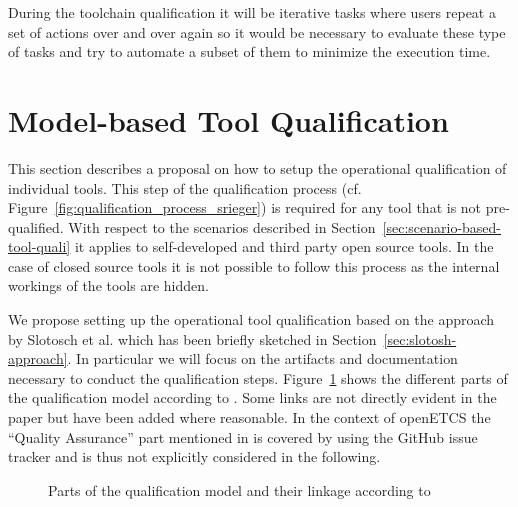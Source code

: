During the toolchain qualification it will be iterative tasks where users repeat a set of actions over and over again so it would be necessary to evaluate these type of tasks and try to automate a subset of them to minimize the execution time.


\section{Model-based Tool Qualification}
\label{sec:model-based-tool-quali}

This section describes a proposal on how to setup the operational qualification of individual tools. This step of the qualification process (cf. Figure~\ref{fig:qualification_process_srieger}) is required for any tool that is not pre-qualified. With respect to the scenarios described in Section~\ref{sec:scenario-based-tool-quali} it applies to self-developed and third party open source tools. In the case of closed source tools it is not possible to follow this process as the internal workings of the tools are hidden.

We propose setting up the operational tool qualification based on the approach by Slotosch et al. which has been briefly sketched in Section~\ref{sec:slotosh-approach}. In particular we will focus on the artifacts and documentation necessary to conduct the qualification steps. Figure~\ref{fig:qualification-models-linkage} shows the different parts of the qualification model according to \cite{slotosch_model-based_2012}. Some links are not directly evident in the paper but have been added where reasonable. In the context of openETCS the ``Quality Assurance'' part mentioned in \cite{slotosch_model-based_2012} is covered by using the GitHub issue tracker and is thus not explicitly considered in the following.

\begin{figure}
\begin{center}
\end{center}
\caption{Parts of the qualification model and their linkage according to \cite{slotosch_model-based_2012}}
\label{fig:qualification-models-linkage}
\end{figure}


